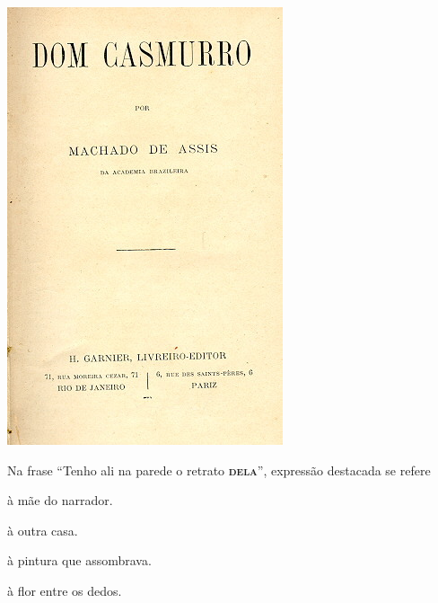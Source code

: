 \begin{myquote}
\begin{minipage}{0.35\textwidth}
  \includegraphics[width=\textwidth]{./imgSAEB_7_POR/media/image55.png}
\end{minipage}


\end{myquote}

Na frase ``Tenho ali na parede o retrato \textsc{\textbf{dela}}'', expressão destacada
se refere

\begin{escolha}

  \item à mãe do narrador.
  
  \item à outra casa. 
  
  \item à pintura que assombrava.
  
  \item à flor entre os dedos.

\end{escolha}


